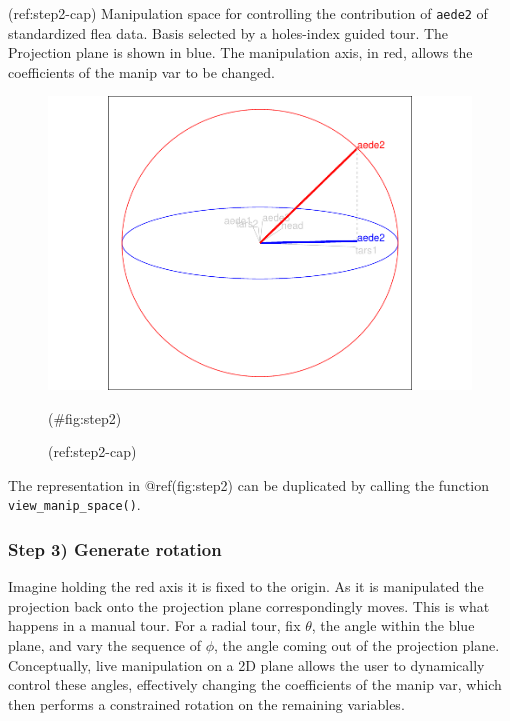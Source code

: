 (ref:step2-cap) Manipulation space for controlling the contribution of \texttt{aede2} of standardized flea data. Basis selected by a holes-index guided tour. The Projection plane is shown in blue. The manipulation axis, in red, allows the coefficients of the manip var to be changed.

\begin{Schunk}
\begin{figure}

{\centering \includegraphics[width=1\linewidth]{spinifex_paper_files/figure-latex/step2-1} 

}

\caption[(ref:step2-cap)]{(ref:step2-cap)}(\#fig:step2)
\end{figure}
\end{Schunk}

The representation in @ref(fig:step2) can be duplicated by calling the function \texttt{view\_manip\_space()}.

\hypertarget{step-3-generate-rotation}{%
\subsubsection{Step 3) Generate rotation}\label{step-3-generate-rotation}}

Imagine holding the red axis it is fixed to the origin. As it is manipulated the projection back onto the projection plane correspondingly moves. This is what happens in a manual tour. For a radial tour, fix \(\theta\), the angle within the blue plane, and vary the sequence of \(\phi\), the angle coming out of the projection plane. Conceptually, live manipulation on a 2D plane allows the user to dynamically control these angles, effectively changing the coefficients of the manip var, which then performs a constrained rotation on the remaining variables.

